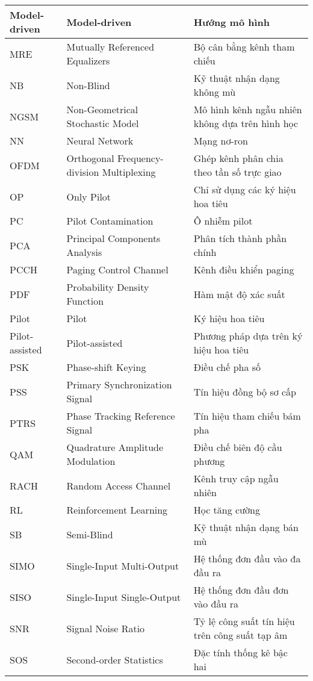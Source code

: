 {{\begin{longtable}{|p{2.35cm}|>{\raggedright}p{6.2cm}|p{5.75cm}|}
\hline
Model-driven & Model-driven & Hướng mô hình \\ 
\hline
MRE & Mutually Referenced Equalizers & Bộ cân bằng kênh tham chiếu \\ 
\hline
NB & Non-Blind & Kỹ thuật nhận dạng không mù \\ 
\hline
NGSM & Non-Geometrical Stochastic Model & Mô hình kênh ngẫu nhiên không dựa trên hình học \\
\hline
NN & Neural Network & Mạng nơ-ron \\ 
\hline
OFDM & Orthogonal Frequency-division Multiplexing & Ghép kênh phân chia theo tần số trực giao \\ 
\hline
OP & Only Pilot & Chỉ sử dụng các ký hiệu hoa tiêu \\ 
\hline
PC & Pilot Contamination & Ô nhiễm pilot \\ 
\hline
PCA & Principal Components Analysis & Phân tích thành phần chính \\ 
\hline
PCCH & Paging Control Channel & Kênh điều khiển paging \\ 
\hline
PDF & Probability Density Function & Hàm mật độ xác suất \\ 
\hline
Pilot & Pilot & Ký hiệu hoa tiêu \\ 
\hline
Pilot-assisted & Pilot-assisted & Phương pháp dựa trên ký hiệu hoa tiêu \\ 
\hline
PSK & Phase-shift Keying & Điều chế pha số \\ 
\hline
PSS & Primary Synchronization Signal & Tín hiệu đồng bộ sơ cấp \\ 
\hline
PTRS & Phase Tracking Reference Signal & Tín hiệu tham chiếu bám pha \\ 
\hline
QAM & Quadrature Amplitude Modulation & Điều chế biên độ cầu phương \\ 
\hline
RACH & Random Access Channel & Kênh truy cập ngẫu nhiên \\ 
\hline
RL & Reinforcement Learning & Học tăng cường \\ 
\hline
SB & Semi-Blind & Kỹ thuật nhận dạng bán mù \\ 
\hline
SIMO & Single-Input Multi-Output & Hệ thống đơn đầu vào đa đầu ra \\ 
\hline
SISO & Single-Input Single-Output & Hệ thống đơn đầu đơn vào đầu ra \\ 
\hline
SNR & Signal Noise Ratio & Tỷ lệ công suất tín hiệu trên công suất tạp âm \\ 
\hline
SOS & Second-order Statistics & Đặc tính thống kê bậc hai \\ 

\end{longtable}}}
